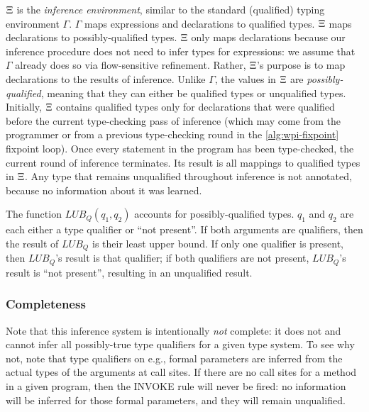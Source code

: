 $\Xi$ is the \emph{inference environment}, similar to the standard (qualified)
typing environment $\Gamma$. $\Gamma$ maps expressions and declarations to qualified types.
$\Xi$ maps declarations to possibly-qualified types.
$\Xi$ only maps declarations because our inference procedure does not need to infer
types for expressions: we assume that $\Gamma$ already does so via flow-sensitive
refinement. Rather, $\Xi$'s purpose is to map declarations to the results of inference.
Unlike $\Gamma$, the values in $\Xi$ are \emph{possibly-qualified}, meaning that they can either
be qualified types or unqualified types. Initially, $\Xi$ contains qualified types only
for declarations that were qualified before the current type-checking pass of inference (which may come from
the programmer or from a previous type-checking round in the \cref{alg:wpi-fixpoint} fixpoint loop).
Once every statement in the program has been type-checked, the current
round of inference terminates.  Its result is all mappings to qualified
types in $\Xi$.  Any type that remains unqualified
throughout inference is not annotated, because no information about it was learned.

The function $\mathit{LUB_Q}(q_1, q_2)$ accounts for possibly-qualified types.
$q_1$ and $q_2$ are each either a type qualifier or ``not present''.
If both arguments are qualifiers, then the result of $\mathit{LUB_Q}$
is their least upper bound. If only one qualifier is present, then $\mathit{LUB_Q}$'s result
is that qualifier; if both qualifiers are not present, $\mathit{LUB_Q}$'s result is ``not present'',
resulting in an unqualified result.




\subsubsection{Completeness}
\label{sec:complete}

Note that this inference system is intentionally \emph{not} complete: it
does not and cannot infer all possibly-true type qualifiers for a given type
system. To see why not, note that type qualifiers on e.g., formal parameters
are inferred from the actual types of the arguments at call sites. If there
are no call sites for a method in a given program, then the \textsc{INVOKE}
rule will never be fired: no information will be inferred for those formal
parameters,
and they will remain unqualified.

